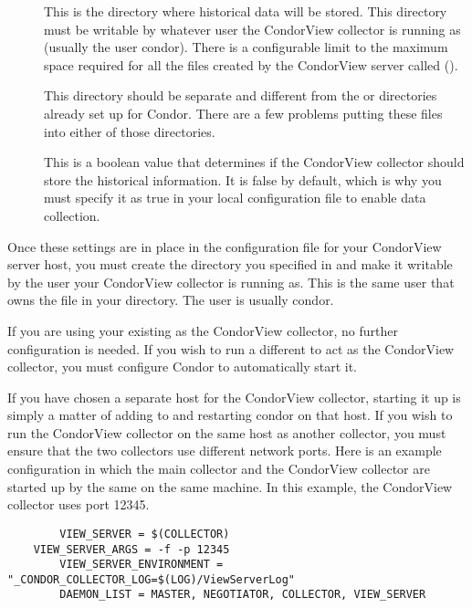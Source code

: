 \begin{description}

\item[] This is the directory where
historical data will be stored.
This directory must be writable by whatever user the CondorView
collector is running as (usually the user condor).  
There is a configurable limit to the maximum space required for all
the files created by the CondorView server called
(). 

\Note This directory should be separate and different from the
 or  directories already set up for
Condor.
There are a few problems putting these files into either of those
directories.

\item[] This is a boolean value that determines
if the CondorView collector should store the historical information.
It is false by default, which is why you must specify it as true in
your local configuration file to enable data collection.

\end{description}

Once these settings are in place in the configuration file for your
CondorView server host, you must create the directory you specified
in  and make it writable by the user your
CondorView collector is running as.
This is the same user that owns the  file in
your  directory. The user is usually condor.

If you are using your existing  as the CondorView collector,
no further configuration is needed.  If you wish to run a different
 to act as the CondorView collector, you must configure
Condor to automatically start it.

If you have chosen a separate host for the CondorView collector,
starting it up is simply a matter of adding  to
 and restarting condor on that host.  If you wish
to run the CondorView collector on the same host as another collector,
you must ensure that the two collectors use different network ports.
Here is an example configuration in which the main collector and the
CondorView collector are started up by the same  on
the same machine.  In this example, the CondorView collector uses
port 12345.

\begin{verbatim}
        VIEW_SERVER = $(COLLECTOR)
	VIEW_SERVER_ARGS = -f -p 12345
        VIEW_SERVER_ENVIRONMENT = "_CONDOR_COLLECTOR_LOG=$(LOG)/ViewServerLog"
        DAEMON_LIST = MASTER, NEGOTIATOR, COLLECTOR, VIEW_SERVER
\end{verbatim}

